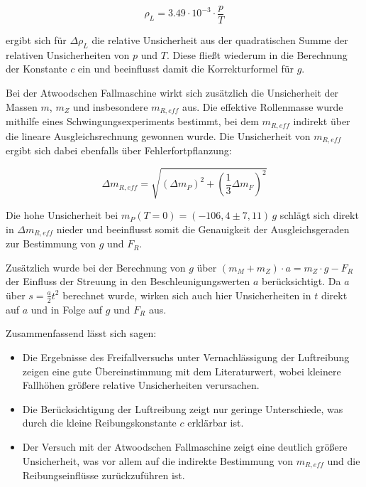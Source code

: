 \documentclass{protokoll}
\begin{document}
\begin{equation}
\rho_L = 3.49\cdot 10^{-3} \cdot \frac{p}{T}
\end{equation}

ergibt sich für $\Delta \rho_L$ die relative Unsicherheit aus der quadratischen Summe der relativen Unsicherheiten von $p$ und $T$. Diese fließt wiederum in die Berechnung der Konstante $c$ ein und beeinflusst damit die Korrekturformel für $g$.

Bei der Atwoodschen Fallmaschine wirkt sich zusätzlich die Unsicherheit der Massen $m$, $m_Z$ und insbesondere $m_{R,eff}$ aus. Die effektive Rollenmasse wurde mithilfe eines Schwingungsexperiments bestimmt, bei dem $m_{R,eff}$ indirekt über die lineare Ausgleichsrechnung gewonnen wurde. Die Unsicherheit von $m_{R,eff}$ ergibt sich dabei ebenfalls über Fehlerfortpflanzung:

\begin{equation}
\Delta m_{R,eff} = \sqrt{ (\Delta m_P)^2 + \left( \frac{1}{3} \Delta m_F \right)^2 }
\end{equation}

Die hohe Unsicherheit bei $m_P(T=0) = (-106{,}4 \pm 7{,}11)\,g$ schlägt sich direkt in $\Delta m_{R,eff}$ nieder und beeinflusst somit die Genauigkeit der Ausgleichsgeraden zur Bestimmung von $g$ und $F_R$.

Zusätzlich wurde bei der Berechnung von $g$ über $(m_M + m_Z) \cdot a = m_Z \cdot g - F_R$ der Einfluss der Streuung in den Beschleunigungswerten $a$ berücksichtigt. Da $a$ über $s = \frac{a}{2} t^2$ berechnet wurde, wirken sich auch hier Unsicherheiten in $t$ direkt auf $a$ und in Folge auf $g$ und $F_R$ aus.

Zusammenfassend lässt sich sagen:
\begin{itemize}
  \item Die Ergebnisse des Freifallversuchs unter Vernachlässigung der Luftreibung zeigen eine gute Übereinstimmung mit dem Literaturwert, wobei kleinere Fallhöhen größere relative Unsicherheiten verursachen.
  \item Die Berücksichtigung der Luftreibung zeigt nur geringe Unterschiede, was durch die kleine Reibungskonstante $c$ erklärbar ist.
  \item Der Versuch mit der Atwoodschen Fallmaschine zeigt eine deutlich größere Unsicherheit, was vor allem auf die indirekte Bestimmung von $m_{R,eff}$ und die Reibungseinflüsse zurückzuführen ist.
\end{itemize}
\end{document}
